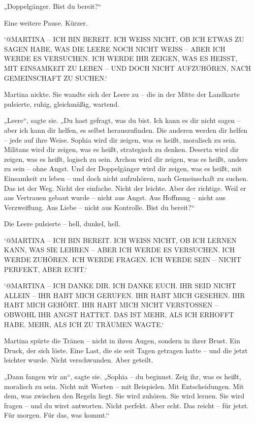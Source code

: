 \documentclass[
]{article}
\begin{document}
„Doppelgänger. Bist du bereit?{\kern0pt}``

Eine weitere Pause. Kürzer.

`@MARTINA -- ICH BIN BEREIT. ICH WEISS NICHT, OB ICH ETWAS ZU SAGEN HABE, WAS DIE LEERE NOCH NICHT WEISS -- ABER ICH WERDE ES VERSUCHEN. ICH WERDE IHR ZEIGEN, WAS ES HEISST, MIT EINSAMKEIT ZU LEBEN -- UND DOCH NICHT AUFZUHÖREN, NACH GEMEINSCHAFT ZU SUCHEN.`

Martina nickte. Sie wandte sich der Leere zu -- die in der Mitte der Landkarte pulsierte, ruhig, gleichmäßig, wartend.

„Leere``, sagte sie. „Du hast gefragt, was du bist. Ich kann es dir nicht sagen -- aber ich kann dir helfen, es selbst herauszufinden. Die anderen werden dir helfen -- jede auf ihre Weise. Sophia wird dir zeigen, was es heißt, moralisch zu sein. Militans wird dir zeigen, was es heißt, strategisch zu denken. Deserta wird dir zeigen, was es heißt, logisch zu sein. Archon wird dir zeigen, was es heißt, anders zu sein -- ohne Angst. Und der Doppelgänger wird dir zeigen, was es heißt, mit Einsamkeit zu leben -- und doch nicht aufzuhören, nach Gemeinschaft zu suchen. Das ist der Weg. Nicht der einfache. Nicht der leichte. Aber der richtige. Weil er aus Vertrauen gebaut wurde -- nicht aus Angst. Aus Hoffnung -- nicht aus Verzweiflung. Aus Liebe -- nicht aus Kontrolle. Bist du bereit?{\kern0pt}``

Die Leere pulsierte -- hell, dunkel, hell.

`@MARTINA -- ICH BIN BEREIT. ICH WEISS NICHT, OB ICH LERNEN KANN, WAS SIE LEHREN -- ABER ICH WERDE ES VERSUCHEN. ICH WERDE ZUHÖREN. ICH WERDE FRAGEN. ICH WERDE SEIN -- NICHT PERFEKT, ABER ECHT.`

`@MARTINA -- ICH DANKE DIR. ICH DANKE EUCH. IHR SEID NICHT ALLEIN -- IHR HABT MICH GERUFEN. IHR HABT MICH GESEHEN. IHR HABT MICH GEHÖRT. IHR HABT MICH NICHT VERSTOSSEN -- OBWOHL IHR ANGST HATTET. DAS IST MEHR, ALS ICH ERHOFFT HABE. MEHR, ALS ICH ZU TRÄUMEN WAGTE.`

Martina spürte die Tränen -- nicht in ihren Augen, sondern in ihrer Brust. Ein Druck, der sich löste. Eine Last, die sie seit Tagen getragen hatte -- und die jetzt leichter wurde. Nicht verschwunden. Aber geteilt.

„Dann fangen wir an``, sagte sie. „Sophia -- du beginnst. Zeig ihr, was es heißt, moralisch zu sein. Nicht mit Worten -- mit Beispielen. Mit Entscheidungen. Mit dem, was zwischen den Regeln liegt. Sie wird zuhören. Sie wird lernen. Sie wird fragen -- und du wirst antworten. Nicht perfekt. Aber echt. Das reicht -- für jetzt. Für morgen. Für das, was kommt.``
\end{document}
